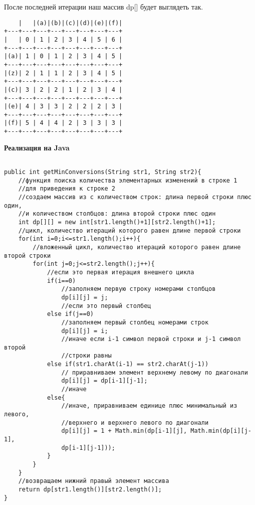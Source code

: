 После последней итерации наш массив dp[] будет выглядеть так.

\newpage

\begin{tcolorbox}
\begin{verbatim}
    |   |(a)|(b)|(c)|(d)|(e)|(f)|
+---+---+---+---+---+---+---+---+
|   | 0 | 1 | 2 | 3 | 4 | 5 | 6 |
+---+---+---+---+---+---+---+---+
|(a)| 1 | 0 | 1 | 2 | 3 | 4 | 5 |
+---+---+---+---+---+---+---+---+
|(z)| 2 | 1 | 1 | 2 | 3 | 4 | 5 |
+---+---+---+---+---+---+---+---+
|(c)| 3 | 2 | 2 | 1 | 2 | 3 | 4 |
+---+---+---+---+---+---+---+---+
|(e)| 4 | 3 | 3 | 2 | 2 | 2 | 3 |
+---+---+---+---+---+---+---+---+
|(f)| 5 | 4 | 4 | 2 | 3 | 3 | 3 |
+---+---+---+---+---+---+---+---+
\end{verbatim}
\end{tcolorbox}

\textbf{Реализация на Java}

\begin{tcolorbox}
\begin{verbatim}

public int getMinConversions(String str1, String str2){
    //функция поиска количества элементарных изменений в строке 1 
    //для приведения к строке 2
    //создаем массив из с количеством строк: длина первой строки плюс один, 
    //и количеством столбцов: длина второй строки плюс один
    int dp[][] = new int[str1.length()+1][str2.length()+1];
    //цикл, количество итераций которого равен длине первой строки
    for(int i=0;i<=str1.length();i++){
        //вложенный цикл, количество итераций которого равен длине второй строки
        for(int j=0;j<=str2.length();j++){
            //если это первая итерация внешнего цикла
            if(i==0)
                //заполняем первую строку номерами столбцов
                dp[i][j] = j;
                //если это первый столбец
            else if(j==0)
                //заполняем первый столбец номерами строк
                dp[i][j] = i;
                //иначе если i-1 символ первой строки и j-1 символ второй 
                //строки равны
            else if(str1.charAt(i-1) == str2.charAt(j-1))
                // приравниваем элемент верхнему левому по диагонали
                dp[i][j] = dp[i-1][j-1];
                //иначе
            else{
                //иначе, приравниваем единице плюс минимальный из левого, 
                //верхнего и верхнего левого по диагонали
                dp[i][j] = 1 + Math.min(dp[i-1][j], Math.min(dp[i][j-1], 
                dp[i-1][j-1]));
            }
        }
    }
    //возвращаем нижний правый элемент массива
    return dp[str1.length()][str2.length()];
}

\end{verbatim}
\end{tcolorbox}